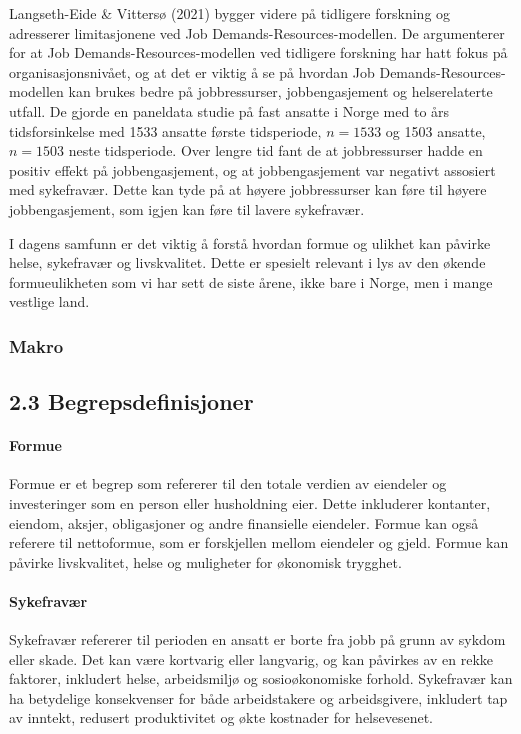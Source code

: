 \documentclass[
  12pt,
  a4paper,
  DIV=11,
  numbers=noendperiod]{scrartcl}
\let\oldparagraph\paragraph
\renewcommand{\paragraph}[1]{\oldparagraph{#1}\mbox{}}
\begin{document}
Langseth-Eide \& Vittersø (2021) bygger videre på tidligere forskning og
adresserer limitasjonene ved Job Demands-Resources-modellen. De
argumenterer for at Job Demands-Resources-modellen ved tidligere
forskning har hatt fokus på organisasjonsnivået, og at det er viktig å
se på hvordan Job Demands-Resources-modellen kan brukes bedre på
jobbressurser, jobbengasjement og helserelaterte utfall. De gjorde en
paneldata studie på fast ansatte i Norge med to års tidsforsinkelse med
1533 ansatte første tidsperiode, \(n =1533\) og 1503 ansatte,
\(n = 1503\) neste tidsperiode. Over lengre tid fant de at jobbressurser
hadde en positiv effekt på jobbengasjement, og at jobbengasjement var
negativt assosiert med sykefravær. Dette kan tyde på at høyere
jobbressurser kan føre til høyere jobbengasjement, som igjen kan føre
til lavere sykefravær.

I dagens samfunn er det viktig å forstå hvordan formue og ulikhet kan
påvirke helse, sykefravær og livskvalitet. Dette er spesielt relevant i
lys av den økende formueulikheten som vi har sett de siste årene, ikke
bare i Norge, men i mange vestlige land.

\subsubsection{Makro}\label{makro}

\subsection{2.3 Begrepsdefinisjoner}\label{begrepsdefinisjoner}

\paragraph{Formue}\label{formue}

Formue er et begrep som refererer til den totale verdien av eiendeler og
investeringer som en person eller husholdning eier. Dette inkluderer
kontanter, eiendom, aksjer, obligasjoner og andre finansielle eiendeler.
Formue kan også referere til nettoformue, som er forskjellen mellom
eiendeler og gjeld. Formue kan påvirke livskvalitet, helse og muligheter
for økonomisk trygghet.

\paragraph{Sykefravær}\label{sykefravuxe6r}

Sykefravær refererer til perioden en ansatt er borte fra jobb på grunn
av sykdom eller skade. Det kan være kortvarig eller langvarig, og kan
påvirkes av en rekke faktorer, inkludert helse, arbeidsmiljø og
sosioøkonomiske forhold. Sykefravær kan ha betydelige konsekvenser for
både arbeidstakere og arbeidsgivere, inkludert tap av inntekt, redusert
produktivitet og økte kostnader for helsevesenet.
\end{document}
